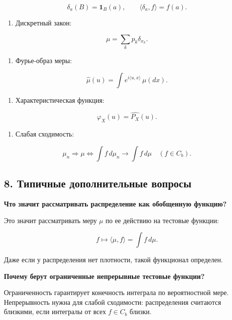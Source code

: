 \documentclass[
  11pt,
  a4paper,
]{article}
\providecommand{\tightlist}{%
  \setlength{\itemsep}{0pt}\setlength{\parskip}{0pt}}
\begin{document}
\[
\delta_a(B)=\mathbf 1_B(a),
\qquad
\langle\delta_a,f\rangle=f(a).
\]

\begin{enumerate}
\def\labelenumi{\arabic{enumi}.}
\setcounter{enumi}{3}
\tightlist
\item
  Дискретный закон:
\end{enumerate}

\[
\mu=\sum_kp_k\delta_{x_k}.
\]

\begin{enumerate}
\def\labelenumi{\arabic{enumi}.}
\setcounter{enumi}{4}
\tightlist
\item
  Фурье-образ меры:
\end{enumerate}

\[
\widehat\mu(u)=\int e^{i\langle u,x\rangle}\,\mu(dx).
\]

\begin{enumerate}
\def\labelenumi{\arabic{enumi}.}
\setcounter{enumi}{5}
\tightlist
\item
  Характеристическая функция:
\end{enumerate}

\[
\varphi_X(u)=\widehat{P_X}(u).
\]

\begin{enumerate}
\def\labelenumi{\arabic{enumi}.}
\setcounter{enumi}{6}
\tightlist
\item
  Слабая сходимость:
\end{enumerate}

\[
\mu_n\Rightarrow\mu
\Longleftrightarrow
\int f\,d\mu_n\to\int f\,d\mu
\quad(f\in C_b).
\]

\subsection{8. Типичные дополнительные
вопросы}\label{ux442ux438ux43fux438ux447ux43dux44bux435-ux434ux43eux43fux43eux43bux43dux438ux442ux435ux43bux44cux43dux44bux435-ux432ux43eux43fux440ux43eux441ux44b}

\textbf{Что значит рассматривать распределение как обобщенную функцию?}

Это значит рассматривать меру \(\mu\) по ее действию на тестовые
функции:

\[
f\mapsto\langle\mu,f\rangle=\int f\,d\mu.
\]

Даже если у распределения нет плотности, такой функционал определен.

\textbf{Почему берут ограниченные непрерывные тестовые функции?}

Ограниченность гарантирует конечность интеграла по вероятностной мере.
Непрерывность нужна для слабой сходимости: распределения считаются
близкими, если интегралы от всех \(f\in C_b\) близки.
\end{document}
